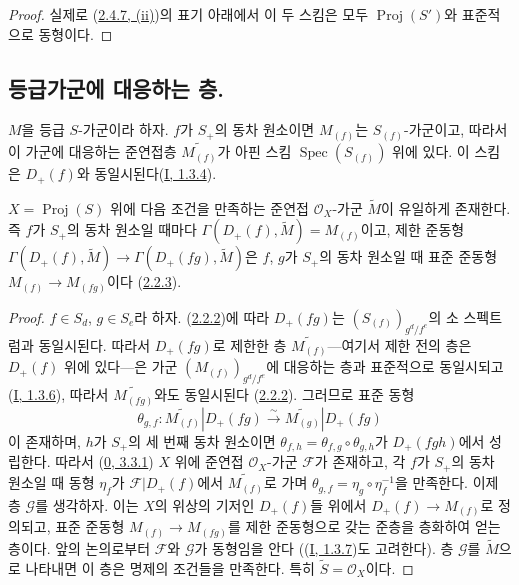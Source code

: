 \begin{proof}
실제로 (\hyperref[II.2.4.7-ko]{2.4.7, (ii)})의 표기 아래에서 이 두
스킴은 모두 $\operatorname{Proj}(S')$와 표준적으로 동형이다.
\end{proof}

\subsection{등급가군에 대응하는 층.}
\label{subsection:II.2.5-ko}

\begin{env}[2.5.1]
\label{II.2.5.1-ko}
$M$을 등급 $S$-가군이라 하자. $f$가 $S_+$의 동차 원소이면
$M_{(f)}$는 $S_{(f)}$-가군이고, 따라서 이 가군에 대응하는 준연접층
$\widetilde{M_{(f)}}$가 아핀 스킴
$\operatorname{Spec}(S_{(f)})$ 위에 있다. 이 스킴은 $D_+(f)$와
동일시된다(\hyperref[I.1.3.4-ko]{I, 1.3.4}).
\end{env}

\begin{proposition}[2.5.2]
\label{II.2.5.2-ko}
$X=\operatorname{Proj}(S)$ 위에 다음 조건을 만족하는 준연접
$\mathcal{O}_X$-가군 $\widetilde{M}$이 유일하게 존재한다. 즉 $f$가
$S_+$의 동차 원소일 때마다
$\Gamma(D_+(f),\widetilde{M})=M_{(f)}$이고, 제한 준동형
$\Gamma(D_+(f),\widetilde{M})\to
\Gamma(D_+(fg),\widetilde{M})$은 $f$, $g$가 $S_+$의 동차 원소일 때
표준 준동형 $M_{(f)}\to M_{(fg)}$이다
(\hyperref[II.2.2.3-ko]{2.2.3}).
\end{proposition}

\begin{proof}
$f\in S_d$, $g\in S_e$라 하자.
(\hyperref[II.2.2.2-ko]{2.2.2})에 따라 $D_+(fg)$는
$(S_{(f)})_{g^d/f^e}$의 소 스펙트럼과 동일시된다. 따라서
$D_+(fg)$로 제한한 층 $\widetilde{M_{(f)}}$---여기서 제한 전의 층은
$D_+(f)$ 위에 있다---은 가군 $(M_{(f)})_{g^d/f^e}$에 대응하는 층과 표준적으로
동일시되고(\hyperref[I.1.3.6-ko]{I, 1.3.6}), 따라서
$\widetilde{M_{(fg)}}$와도 동일시된다
(\hyperref[II.2.2.2-ko]{2.2.2}). 그러므로 표준 동형
\[
  \theta_{g,f}:\widetilde{M_{(f)}}|D_+(fg)
  \xrightarrow{\sim}\widetilde{M_{(g)}}|D_+(fg)
\]
이 존재하며, $h$가 $S_+$의 세 번째 동차 원소이면
$\theta_{f,h}=\theta_{f,g}\circ\theta_{g,h}$가 $D_+(fgh)$에서 성립한다.
따라서
(\hyperref[0.3.3.1-ko]{0, 3.3.1}) $X$ 위에 준연접
$\mathcal{O}_X$-가군 $\mathcal{F}$가 존재하고, 각 $f$가 $S_+$의 동차
원소일 때 동형 $\eta_f$가 $\mathcal{F}|D_+(f)$에서
$\widetilde{M_{(f)}}$로 가며 $\theta_{g,f}=\eta_g\circ\eta_f^{-1}$을
만족한다.
이제 층 $\mathcal{G}$를 생각하자. 이는 $X$의 위상의 기저인
$D_+(f)$들 위에서 $D_+(f)\to M_{(f)}$로 정의되고, 표준 준동형
$M_{(f)}\to M_{(fg)}$를 제한 준동형으로 갖는 준층을 층화하여 얻는
층이다. 앞의 논의로부터 $\mathcal{F}$와 $\mathcal{G}$가 동형임을 안다
((\hyperref[I.1.3.7-ko]{I, 1.3.7})도 고려한다). 층 $\mathcal{G}$를
$\widetilde{M}$으로 나타내면 이 층은 명제의 조건들을 만족한다. 특히
$\widetilde{S}=\mathcal{O}_X$이다.
\end{proof}

